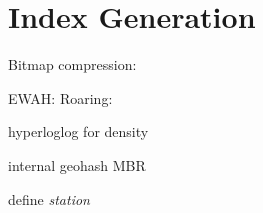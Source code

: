 \pagebreak
\section{Index Generation}

Bitmap compression: \cite{antoshenkov1995byte,colantonio2010concise,chan1998bitmap,antoine2011accelerating}

EWAH: \cite{lemire2010sorting}
Roaring: \cite{lemire2016consistently,chambi2016better}

hyperloglog for density

internal geohash MBR

define \emph{station}


